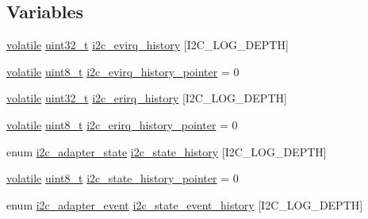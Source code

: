 \subsection*{Variables}
\begin{DoxyCompactItemize}
\item 
\hyperlink{group___c_m_s_i_s___core___instruction_interface_gad7d93af13046b0378601b85c8c16673b}{volatile} \hyperlink{stdint_8h_a435d1572bf3f880d55459d9805097f62}{uint32\-\_\-t} \hyperlink{group___p_i_o_s___i2_c_ga958ee525a13dda424039275af66ad3ce}{i2c\-\_\-evirq\-\_\-history} \mbox{[}I2\-C\-\_\-\-L\-O\-G\-\_\-\-D\-E\-P\-T\-H\mbox{]}
\item 
\hyperlink{group___c_m_s_i_s___core___instruction_interface_gad7d93af13046b0378601b85c8c16673b}{volatile} \hyperlink{stdint_8h_aba7bc1797add20fe3efdf37ced1182c5}{uint8\-\_\-t} \hyperlink{group___p_i_o_s___i2_c_gadf5676851d3bae320be666713dd5cb95}{i2c\-\_\-evirq\-\_\-history\-\_\-pointer} = 0
\item 
\hyperlink{group___c_m_s_i_s___core___instruction_interface_gad7d93af13046b0378601b85c8c16673b}{volatile} \hyperlink{stdint_8h_a435d1572bf3f880d55459d9805097f62}{uint32\-\_\-t} \hyperlink{group___p_i_o_s___i2_c_ga682906503c30ce6f539ac8f7628346f8}{i2c\-\_\-erirq\-\_\-history} \mbox{[}I2\-C\-\_\-\-L\-O\-G\-\_\-\-D\-E\-P\-T\-H\mbox{]}
\item 
\hyperlink{group___c_m_s_i_s___core___instruction_interface_gad7d93af13046b0378601b85c8c16673b}{volatile} \hyperlink{stdint_8h_aba7bc1797add20fe3efdf37ced1182c5}{uint8\-\_\-t} \hyperlink{group___p_i_o_s___i2_c_ga0593115613cf2d368fe6dbe7b4e5dcff}{i2c\-\_\-erirq\-\_\-history\-\_\-pointer} = 0
\item 
enum \hyperlink{pios__i2c__priv_8h_ac73b69ffe53544057fa2e4751fd9c22b}{i2c\-\_\-adapter\-\_\-state} \hyperlink{group___p_i_o_s___i2_c_ga207839e0ce4c1011c30ea9254657251c}{i2c\-\_\-state\-\_\-history} \mbox{[}I2\-C\-\_\-\-L\-O\-G\-\_\-\-D\-E\-P\-T\-H\mbox{]}
\item 
\hyperlink{group___c_m_s_i_s___core___instruction_interface_gad7d93af13046b0378601b85c8c16673b}{volatile} \hyperlink{stdint_8h_aba7bc1797add20fe3efdf37ced1182c5}{uint8\-\_\-t} \hyperlink{group___p_i_o_s___i2_c_gad02d69a4953e925d905e000697a0d885}{i2c\-\_\-state\-\_\-history\-\_\-pointer} = 0
\item 
enum \hyperlink{group___p_i_o_s___i2_c_ga2a8f77797f5dbd873514e92d3d043649}{i2c\-\_\-adapter\-\_\-event} \hyperlink{group___p_i_o_s___i2_c_gad2fddef6926d27512901cbe84b7b99bd}{i2c\-\_\-state\-\_\-event\-\_\-history} \mbox{[}I2\-C\-\_\-\-L\-O\-G\-\_\-\-D\-E\-P\-T\-H\mbox{]}

\end{DoxyCompactItemize}
